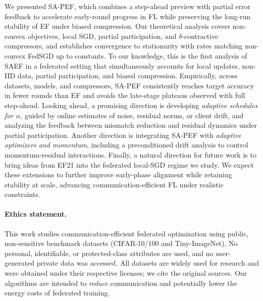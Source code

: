 \documentclass{article} %
\begin{document}
We presented {SA-PEF}, which combines a step-ahead preview with partial error feedback to accelerate early-round progress in FL while preserving the long-run stability of EF under biased compression. Our theoretical analysis covers non-convex objectives, local SGD, partial participation, and \(\delta\)-contractive compressors, and establishes convergence to stationarity with rates matching non-convex FedSGD up to constants. To our knowledge, this is the first analysis of SAEF in a federated setting that simultaneously accounts for local updates, non-IID data, partial participation, and biased compression. Empirically, across datasets, models, and compressors, SA-PEF consistently reaches target accuracy in fewer rounds than EF and avoids the late-stage plateaus observed with full step-ahead. Looking ahead, a promising direction is developing \emph{adaptive schedules for \(\alpha\)}, guided by online estimates of noise, residual norms, or client drift, and analyzing the feedback between mismatch reduction and residual dynamics under partial participation. Another direction is integrating SA-PEF with \emph{adaptive optimizers and momentum}, including a preconditioned drift analysis to control momentum-residual interactions. Finally, a natural direction for future work is to bring ideas from EF21 into the federated local-SGD regime we study. %
We expect these extensions to further improve early-phase alignment while retaining stability at scale, advancing communication-efficient FL under realistic constraints. 


\paragraph{Ethics statement.}
This work studies communication-efficient federated optimization using public, non-sensitive benchmark datasets (CIFAR-10/100 and Tiny-ImageNet). No personal, identifiable, or protected-class attributes are used, and no user-generated private data was accessed. All datasets are widely used for research and were obtained under their respective licenses; we cite the original sources. Our algorithms are intended to \emph{reduce} communication and potentially lower the energy costs of federated training.
\end{document}
